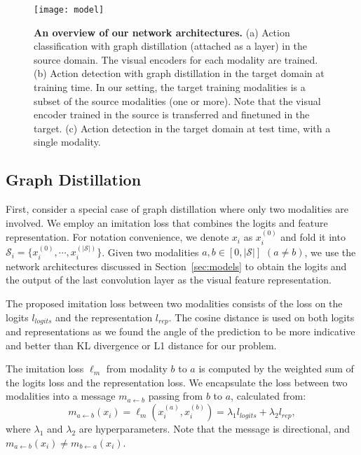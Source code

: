\begin{figure}[t]
\subfigure{\label{fig:modela}}
\subfigure{\label{fig:modelb}}
\subfigure{\label{fig:modelc}}
\begin{center}
\texttt{[image: model]}
\end{center}
\caption{\textbf{An overview of our network architectures.} (a) Action classification with graph distillation (attached as a layer) in the source domain. The visual encoders for each modality are trained. (b) Action detection with graph distillation in the target domain at training time. In our setting, the target training modalities is a subset of the source modalities (one or more). Note that the visual encoder trained in the source is transferred and finetuned in the target. (c) Action detection in the target domain at test time, with a single modality.}
\label{fig:model}
\end{figure}



\subsection{Graph Distillation}\label{sec:collective}

First, consider a special case of graph distillation where only two modalities are involved. 
We employ an imitation loss that combines the logits and feature representation. For notation convenience, we denote $x_i$ as $x_i^{(0)}$ and fold it into $\mathcal{S}_i = \{x_i^{(0)}, \cdots, x_i^{(|\mathcal{S}|)}\}$. Given two modalities $a,b \in [0, |\mathcal{S}|]$ $(a \ne b)$, we use the network architectures discussed in Section~\ref{sec:models} to obtain the logits and the output of the last convolution layer as the visual feature representation.

The proposed imitation loss between two modalities consists of the loss on the logits $l_{logits}$ and the representation $l_{rep}$. The cosine distance is used on both logits and representations as we found the angle of the prediction to be more indicative and better than KL divergence or L1 distance for our problem.

The imitation loss $\ell_m$ from modality $b$ to $a$ is computed by the weighted sum of the logits loss and the representation loss. We encapsulate the loss between two modalities into a message $m_{a \leftarrow b}$ passing from $b$ to $a$, calculated from:
{\small
\begin{equation}
m_{a \leftarrow b}(x_i) = \ell_m(x_i^{(a)}, x_i^{(b)}) = \lambda_1 l_{logits}+\lambda_2 l_{rep},
\label{eq:message_ab}
\end{equation}}where $\lambda_1$ and $\lambda_2$ are hyperparameters. Note that the message is directional, and $m_{a \leftarrow b}(x_i) \ne m_{b \leftarrow a}(x_i)$.


